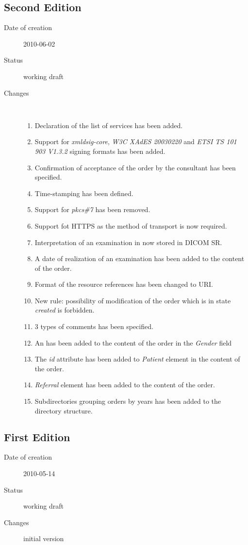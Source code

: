 \documentclass[a4paper]{article}
\begin{document}
\subsection{Second Edition}
\begin{description}
  \item[Date of creation] 2010-06-02
  \item[Status] working draft
  \item[Changes] \hfill \\
	\begin{enumerate}
      \item Declaration of the list of services has been added.
	  \item Support for \emph{xmldsig-core}, \emph{W3C XAdES 20030220} 
		and \emph{ETSI TS 101 903 V1.3.2} signing formats has been added.
	  \item Confirmation of acceptance of the order by the consultant has been specified.
	  \item Time-stamping has been defined.
      \item Support for \emph{pkcs\#7} has been removed.
      \item Support fot HTTPS as the method of transport is now required.
      \item Interpretation of an examination in now stored in DICOM SR.
      \item A date of realization of an examination has been added to the content of the order.
      \item Format of the resource references has been changed to URI.
      \item New rule: possibility of modification of the order which is in state \emph{created}
		is forbidden.
      \item 3 types of comments has been specified.
      \item An  has been added to the content of the 
			order in the \emph{Gender} field
      \item The \emph{id} attribute has been added to \emph{Patient} element in the content
			of the order. 
      \item \emph{Referral} element has been added to the content of the order.
      \item Subdirectories grouping orders by years has been added to the directory 
		structure.
	\end{enumerate}
\end{description}

\subsection{First Edition}
\begin{description}
  \item[Date of creation] 2010-05-14
  \item[Status] working draft
  \item[Changes] initial version
\end{description}
\end{document}
